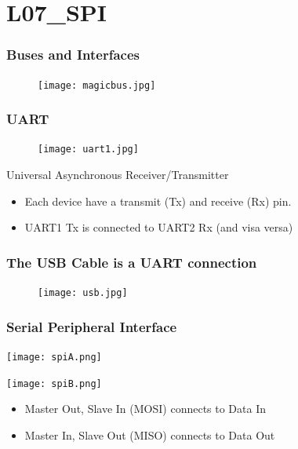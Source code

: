 \documentclass{beamer}
\begin{document}
\section{L07\_SPI}

\begin{frame}\frametitle{Buses and Interfaces}
\begin{figure}[h]
	\texttt{[image: magicbus.jpg]}
\end{figure}
\end{frame}

\begin{frame}\frametitle{UART}
\begin{figure}[h]
	\texttt{[image: uart1.jpg]}
\end{figure}
\begin{center}
Universal Asynchronous Receiver/Transmitter
\end{center}
\begin{itemize}
\item Each device have a transmit (Tx) and receive (Rx) pin.
\item UART1 Tx is connected to UART2 Rx (and visa versa)
\end{itemize}
\end{frame}

\begin{frame}\frametitle{The USB Cable is a UART connection}
\begin{figure}[h]
	\texttt{[image: usb.jpg]}
\end{figure}
\begin{center}

\end{center}
\end{frame}

\begin{frame}\frametitle{Serial Peripheral Interface}
\begin{center}
\texttt{[image: spiA.png]}

\texttt{[image: spiB.png]}

\vspace{.5cm}

\begin{itemize}
\item Master Out, Slave In (MOSI) connects to Data In
\item Master In, Slave Out (MISO) connects to Data Out
\end{itemize}
\end{center}
\end{frame}
\end{document}
